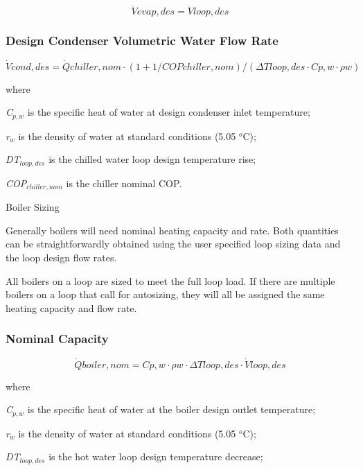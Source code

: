 \begin{equation}
\dot Vevap,des = \dot Vloop,des
\end{equation}

\subsubsection{Design Condenser Volumetric Water Flow Rate}\label{design-condenser-volumetric-water-flow-rate}

\begin{equation}
\dot Vcond,des = \dot Qchiller,nom\cdot (1 + 1/COPchiller,nom)/(\Delta Tloop,des\cdot Cp,w\cdot \rho w)
\end{equation}

where

\emph{C\(_{p,w}\)} is the specific heat of water at design condenser inlet temperature;

\emph{r\(_{w}\)} is the density of water at standard conditions (5.05 \(^{o}\)C);

\emph{DT\(_{loop,des}\)} is the chilled water loop design temperature rise;

\emph{COP\(_{chiller,nom}\)} is the chiller nominal COP.

Boiler Sizing

Generally boilers will need nominal heating capacity and rate. Both quantities can be straightforwardly obtained using the user specified loop sizing data and the loop design flow rates.

All boilers on a loop are sized to meet the full loop load. If there are multiple boilers on a loop that call for autosizing, they will all be assigned the same heating capacity and flow rate.

\subsubsection{Nominal Capacity}\label{nominal-capacity}

\begin{equation}
\dot Qboiler,nom = Cp,w\cdot \rho w\cdot \Delta Tloop,des\cdot \dot Vloop,des
\end{equation}

where

\emph{C\(_{p,w}\)} is the specific heat of water at the boiler design outlet temperature;

\emph{r\(_{w}\)} is the density of water at standard conditions (5.05 \(^{o}\)C);

\emph{DT\(_{loop,des}\)} is the hot water loop design temperature decrease;

